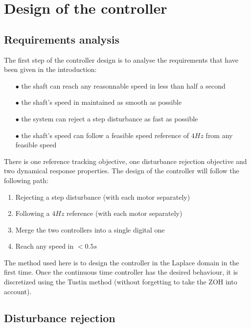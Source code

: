 \setcounter{secnumdepth}{1}

\chapter{Design of the controller}

\section{Requirements analysis}

The first step of the controller design is to analyse the requirements that have been given in the introduction:

\begin{enumerate}
    \item[$\bullet$] the shaft can reach any reasonnable speed in less than half a second
    \item[$\bullet$] the shaft's speed in maintained as smooth as possible
    \item[$\bullet$] the system can reject a step disturbance as fast as possible
    \item[$\bullet$] the shaft's speed can follow a feasible speed reference of $4 Hz$ from any feasible speed
\end{enumerate}

There is one reference tracking objective, one disturbance rejection objective and two dynamical response properties.
The design of the controller will follow the following path:

\begin{enumerate}
    \item Rejecting a step disturbance (with each motor separately)
    \item Following a $4 Hz$ reference (with each motor separately)
    \item Merge the two controllers into a single digital one
    \item Reach any speed in $< 0.5 s$
\end{enumerate}

The method used here is to design the controller in the Laplace domain in the first time. Once the continuous time
controller has the desired behaviour, it is discretized using the Tustin method (without forgetting to take the
ZOH into account).

\section{Disturbance rejection}

